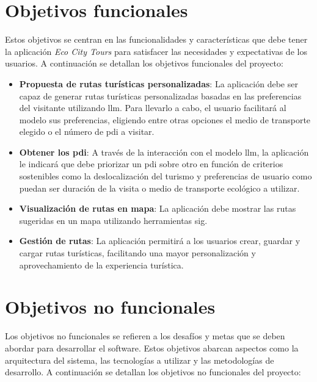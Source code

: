 \label{sec:objetivos}

\section{Objetivos funcionales}

Estos objetivos se centran en las funcionalidades y características que debe tener la aplicación \textit{Eco City Tours} para satisfacer las necesidades y expectativas de los usuarios. A continuación se detallan los objetivos funcionales del proyecto:

\begin{itemize}
    \item \textbf{Propuesta de rutas turísticas personalizadas}: La aplicación debe ser capaz de generar rutas turísticas personalizadas basadas en las preferencias del visitante utilizando \acrfull{llm}. Para llevarlo a cabo, el usuario facilitará al modelo sus preferencias, eligiendo entre otras opciones el medio de transporte elegido o el número de \acrfull{pdi} a visitar.
    \item \textbf{Obtener los \acrfull{pdi}}: A través de la interacción con el modelo \acrshort{llm}, la aplicación le indicará que debe priorizar un \acrshort{pdi} sobre otro en función de criterios sostenibles como la deslocalización del turismo y preferencias de usuario como puedan ser duración de la visita o medio de transporte ecológico a utilizar.
    \item \textbf{Visualización de rutas en mapa}: La aplicación debe mostrar las rutas sugeridas en un mapa utilizando herramientas \acrshort{sig}.
    \item \textbf{Gestión de rutas}: La aplicación permitirá a los usuarios crear, guardar y cargar rutas turísticas, facilitando una mayor personalización y aprovechamiento de la experiencia turística.
    

\end{itemize}

\section{Objetivos no funcionales}

Los objetivos no funcionales se refieren a los desafíos y metas que se deben abordar para desarrollar el software. Estos objetivos abarcan aspectos como la arquitectura del sistema, las tecnologías a utilizar y las metodologías de desarrollo. A continuación se detallan los objetivos no funcionales del proyecto:

